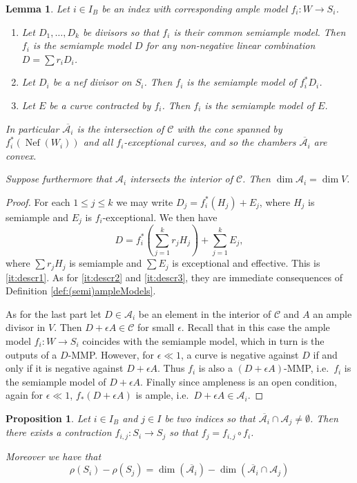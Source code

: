 \documentclass[a4paper,11pt]{amsart}
\newtheorem{lemma}[theorem]{Lemma}
\newtheorem{proposition}[theorem]{Proposition}
\def\dim{\operatorname{dim}}
\def\Nef{\operatorname{Nef}}
\newcommand{\Cc}{\mathcal{C}}
\newcommand{\Aa}{\mathcal{A}}
\begin{document}
\begin{lemma}\label{lem:descrBigChamb2}
	Let $i \in I_B$ be an index with corresponding ample model $f_i \colon W \to S_i$.
	\begin{enumerate}
		\item\label{it:descr1} Let $D_1, \dots, D_k$ be divisors so that $f_i$ is their common semiample model.
		Then $f_i$ is the semiample model $D$ for any non-negative linear combination $D = \sum r_iD_i$.
		\item\label{it:descr2} Let $D_i$ be a nef divisor on $S_i$.
		Then $f_i$ is the semiample model of $f_i^*D_i$.
		\item\label{it:descr3} Let $E$ be a curve contracted by $f_i$.
		Then $f_i$ is the semiample model of $E$.
	\end{enumerate}
	In particular $\overline{\Aa_i}$ is the intersection of $\Cc$ with the cone spanned by $f_i^*(\Nef(W_i))$ and all $f_i$-exceptional curves, and so the chambers $\overline{\Aa_i}$ are convex.
	
	Suppose furthermore that $\Aa_i$ intersects the interior of $\Cc$.
	Then $\dim\Aa_i = \dim V$.
\end{lemma}



\begin{proof}
	For each $1 \leq j \leq k$ we may write $D_j = f_i^*(H_j) + E_j$, where $H_j$ is semiample and $E_j$ is $f_i$-exceptional.
	We then have
	\[
	D =  f_i^*\left(\sum_{j=1}^k r_jH_j\right) + \sum_{j=1}^k E_j,
	\]
	where $\sum r_jH_j$ is semiample and $\sum E_j$ is exceptional and effective.
	This is \eqref{it:descr1}.	
	As for \eqref{it:descr2} and \eqref{it:descr3}, they are immediate consequences of Definition \ref{def:(semi)ampleModels}.
	
	As for the last part let $D \in \Aa_i$ be an element in the interior of $\Cc$ and $A$ an ample divisor in $V$.
	Then $D + \epsilon A \in \Cc$ for small $\epsilon$.	
	Recall that in this case the ample model $f_i\colon W \to S_i$ coincides with the semiample model, which in turn is the outputs of a $D$-MMP.
	However, for $\epsilon \ll 1$, a curve is negative against $D$ if and only if it is negative against $D + \epsilon A$.
	Thus $f_i$ is also a $(D + \epsilon A)$-MMP, i.e.\ $f_i$ is the semiample model of $D + \epsilon A$.
	Finally since ampleness is an open condition, again for $\epsilon \ll 1$, $f_*(D + \epsilon A)$ is ample, i.e.\ $D + \epsilon A \in \Aa_i$.
\end{proof}


\begin{proposition}\label{prop:neighbouring}
	Let $i \in I_B$ and $j\in I$ be two indices so that $\overline{\Aa_i} \cap \Aa_j \neq \emptyset$.
	Then there exists a contraction $f_{i,j}\colon S_i \to S_j$ so that $f_j = f_{i,j} \circ f_i$.
	
	Moreover we have that
	\[
	\rho(S_i) - \rho(S_j) = \dim\left(\overline{\Aa_i}\right)  - \dim\left( \overline{\Aa_i} \cap \Aa_j \right)
	\]
\end{proposition}
\end{document}
